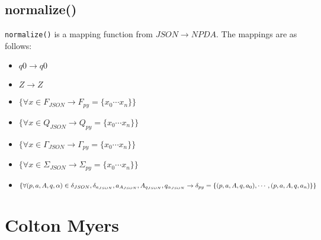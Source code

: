 \documentclass[a4paper]{article}
\begin{document}
\subsection{normalize()}
\texttt{normalize()} is a mapping function from $JSON\rightarrow NPDA$. The
mappings are as follows:
\begin{itemize}
    \item $q0\rightarrow q0$
    \item $Z\rightarrow Z$
    \item $\{\forall x\in F_{JSON} \rightarrow F_{py}=\{x_0\cdots x_n\}\}$
    \item $\{\forall x\in Q_{JSON} \rightarrow Q_{py}=\{x_0\cdots x_n\}\}$
    \item $\{\forall x\in\Gamma_{JSON} \rightarrow \Gamma_{py}=\{x_0\cdots x_n\}\}$
    \item $\{\forall x\in\Sigma_{JSON} \rightarrow \Sigma_{py}=\{x_0\cdots x_n\}\}$
    \item $\{\forall (p,a,A,q,\alpha)\in\delta_{JSON},\delta_{a_{JSON}},
                a_{A_{JSON}},
                A_{q_{JSON}},
                q_{\alpha_{JSON}} \rightarrow\\
                \delta_{py}=\{(p,a,A,q,a_0),\cdots,(p,a,A,q,a_n)\}\}$
\end{itemize}
\section{Colton Myers}
\end{document}
